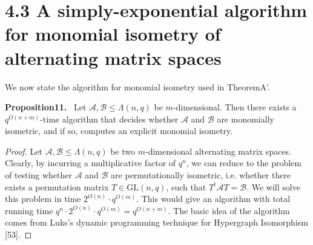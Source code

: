 \documentclass[10pt,a4paper]{article}
\newenvironment{authorclaim}[1]{\par\medskip\noindent\textbf{#1.}\ }{\par\medskip}
\begin{document}
\section*{4.3 A simply-exponential algorithm for monomial isometry of alternating matrix spaces}
We now state the algorithm for monomial isometry used in TheoremA'.
\begin{authorclaim}{Proposition11}
Let $\mathcal A,\mathcal B\le\Lambda(n,q)$ be $m$-dimensional. Then there exists a $q^{O(n+m)}$-time algorithm that decides whether $\mathcal A$ and $\mathcal B$ are monomially isometric, and if so, computes an explicit monomial isometry.
\end{authorclaim}
\begin{proof}
Let $\mathcal A,\mathcal B\le\Lambda(n,q)$ be two $m$-dimensional alternating matrix spaces. Clearly, by incurring a multiplicative factor of $q^n$, we can reduce to the problem of testing whether $\mathcal A$ and $\mathcal B$ are permutationally isometric, i.e. whether there exists a permutation matrix $T\in\mathrm{GL}(n,q)$, such that $T^t\mathcal A T=\mathcal B$. We will solve this problem in time $2^{O(n)}\cdot q^{O(m)}$. This would give an algorithm with total running time $q^n\cdot2^{O(n)}\cdot q^{O(m)}=q^{O(n+m)}$. The basic idea of the algorithm comes from Luks's dynamic programming technique for Hypergraph Isomorphism [53].

\end{proof}
\end{document}
